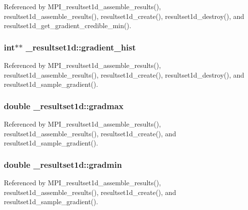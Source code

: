 Referenced by M\+P\+I\+\_\+resultset1d\+\_\+assemble\+\_\+results(), resultset1d\+\_\+assemble\+\_\+results(), resultset1d\+\_\+create(), resultset1d\+\_\+destroy(), and resultset1d\+\_\+get\+\_\+gradient\+\_\+credible\+\_\+min().

\subsubsection[{\texorpdfstring{gradient\+\_\+hist}{gradient_hist}}]{\setlength{\rightskip}{0pt plus 5cm}int$\ast$$\ast$ \+\_\+resultset1d\+::gradient\+\_\+hist}\hypertarget{struct__resultset1d_a367e8a7970df0ccbc667ce47b2d949be}{}\label{struct__resultset1d_a367e8a7970df0ccbc667ce47b2d949be}


Referenced by M\+P\+I\+\_\+resultset1d\+\_\+assemble\+\_\+results(), resultset1d\+\_\+assemble\+\_\+results(), resultset1d\+\_\+create(), resultset1d\+\_\+destroy(), and resultset1d\+\_\+sample\+\_\+gradient().

\subsubsection[{\texorpdfstring{gradmax}{gradmax}}]{\setlength{\rightskip}{0pt plus 5cm}double \+\_\+resultset1d\+::gradmax}\hypertarget{struct__resultset1d_a94862d567a8790cde35959c1aa6764e3}{}\label{struct__resultset1d_a94862d567a8790cde35959c1aa6764e3}


Referenced by M\+P\+I\+\_\+resultset1d\+\_\+assemble\+\_\+results(), resultset1d\+\_\+assemble\+\_\+results(), resultset1d\+\_\+create(), and resultset1d\+\_\+sample\+\_\+gradient().

\subsubsection[{\texorpdfstring{gradmin}{gradmin}}]{\setlength{\rightskip}{0pt plus 5cm}double \+\_\+resultset1d\+::gradmin}\hypertarget{struct__resultset1d_a305c135905f447e82d184e1c4840ef60}{}\label{struct__resultset1d_a305c135905f447e82d184e1c4840ef60}


Referenced by M\+P\+I\+\_\+resultset1d\+\_\+assemble\+\_\+results(), resultset1d\+\_\+assemble\+\_\+results(), resultset1d\+\_\+create(), and resultset1d\+\_\+sample\+\_\+gradient().

